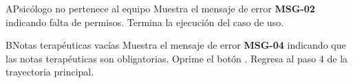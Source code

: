 \begin{UCtrayectoriaA}{A}{Psicólogo no pertenece al equipo}
	\UCpaso Muestra el mensaje de error \textbf{MSG-02} indicando falta de permisos.
	\UCpaso Termina la ejecución del caso de uso.
\end{UCtrayectoriaA}

\begin{UCtrayectoriaA}{B}{Notas terapéuticas vacías}
	\UCpaso Muestra el mensaje de error \textbf{MSG-04} indicando que las notas terapéuticas son obligatorias.
	\UCpaso[\UCactor] Oprime el botón .
	\UCpaso Regresa al paso 4 de la trayectoria principal.
\end{UCtrayectoriaA}

